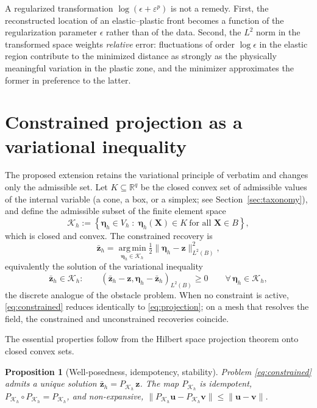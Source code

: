 \documentclass[11pt]{article}
\newcommand{\norm}[1]{\lVert #1 \rVert}
\newcommand{\inner}[2]{\left( #1 , #2 \right)}
\newcommand{\bs}[1]{\boldsymbol{#1}}
\newtheorem{proposition}{Proposition}
\begin{document}
A regularized transformation $\log(\epsilon + \varepsilon^p)$ is not a
remedy. First, the reconstructed location of an elastic--plastic front
becomes a function of the regularization parameter $\epsilon$ rather than
of the data. Second, the $L^2$ norm in the transformed space weights
\emph{relative} error: fluctuations of order $\log \epsilon$ in the
elastic region contribute to the minimized distance as strongly as the
physically meaningful variation in the plastic zone, and the minimizer
approximates the former in preference to the latter.

\section{Constrained projection as a variational inequality}
\label{sec:vi}

The proposed extension retains the variational principle of
\cite{mota2013} verbatim and changes only the admissible set. Let
$K \subseteq \mathbb{R}^q$ be the closed convex set of admissible values
of the internal variable (a cone, a box, or a simplex; see
Section~\ref{sec:taxonomy}), and define the admissible subset of the
finite element space
\begin{equation}
\mathcal{K}_h := \left\{ \bs{\eta}_h \in V_h \;:\;
\bs{\eta}_h(\bs{X}) \in K \ \text{for all } \bs{X} \in B
\right\},
\end{equation}
which is closed and convex. The constrained recovery is
\begin{equation}
\bar{\bs{z}}_h = \operatorname*{arg\,min}_{\bs{\eta}_h \in \mathcal{K}_h}
\tfrac12 \norm{\bs{\eta}_h - \bs{z}}_{L^2(B)}^2 ,
\label{eq:constrained}
\end{equation}
equivalently the solution of the variational inequality
\begin{equation}
\bar{\bs{z}}_h \in \mathcal{K}_h :
\qquad
\inner{\bar{\bs{z}}_h - \bs{z}}{\bs{\eta}_h - \bar{\bs{z}}_h}_{L^2(B)} \geq 0
\qquad \forall\, \bs{\eta}_h \in \mathcal{K}_h ,
\label{eq:vi}
\end{equation}
the discrete analogue of the obstacle problem. When no constraint is
active, \eqref{eq:constrained} reduces identically to
\eqref{eq:projection}; on a mesh that resolves the field, the constrained
and unconstrained recoveries coincide.

The essential properties follow from the Hilbert space projection theorem
onto closed convex sets.

\begin{proposition}[Well-posedness, idempotency, stability]
\label{prop:properties}
Problem \eqref{eq:constrained} admits a unique solution
$\bar{\bs{z}}_h = P_{\mathcal{K}_h}\, \bs{z}$. The map $P_{\mathcal{K}_h}$
is idempotent, $P_{\mathcal{K}_h} \circ P_{\mathcal{K}_h} =
P_{\mathcal{K}_h}$, and non-expansive,
$\norm{P_{\mathcal{K}_h} \bs{u} - P_{\mathcal{K}_h} \bs{v}} \leq
\norm{\bs{u} - \bs{v}}$.
\end{proposition}
\end{document}
